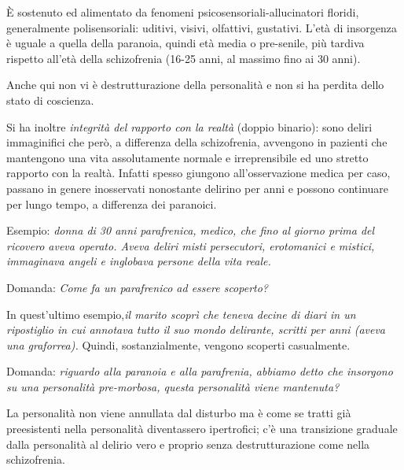 È sostenuto ed alimentato da fenomeni psicosensoriali-allucinatori
floridi, generalmente polisensoriali: uditivi, visivi, olfattivi,
gustativi. L'età di insorgenza è uguale a quella della paranoia, quindi
età media o pre-senile, più tardiva rispetto all'età della schizofrenia
(16-25 anni, al massimo fino ai 30 anni).

Anche qui non vi è destrutturazione della personalità e non si ha
perdita dello stato di coscienza.

Si ha inoltre \emph{integrità del rapporto con la realtà} (doppio
binario): sono deliri immaginifici che però, a differenza della
schizofrenia, avvengono in pazienti che mantengono una vita
assolutamente normale e irreprensibile ed uno stretto rapporto con la
realtà. Infatti spesso giungono all'osservazione medica per caso,
passano in genere inosservati nonostante delirino per anni e possono
continuare per lungo tempo, a differenza dei paranoici.

Esempio: \emph{donna di 30 anni parafrenica, medico, che fino al giorno
prima del ricovero aveva operato. Aveva deliri misti persecutori,
erotomanici e mistici, immaginava angeli e inglobava persone della vita
reale. }

Domanda: \emph{Come fa un parafrenico ad essere scoperto?}

In quest'ultimo esempio,\emph{il marito scoprì che teneva decine di
diari in un ripostiglio in cui annotava tutto il suo mondo delirante,
scritti per anni (aveva una graforrea).} Quindi, sostanzialmente,
vengono scoperti casualmente.

Domanda: \emph{riguardo alla paranoia e alla parafrenia, abbiamo detto
che insorgono su una personalità pre-morbosa, questa personalità viene
mantenuta?}

La personalità non viene annullata dal disturbo ma è come se tratti già
preesistenti nella personalità diventassero ipertrofici; c'è una
transizione graduale dalla personalità al delirio vero e proprio senza
destrutturazione come nella schizofrenia.
